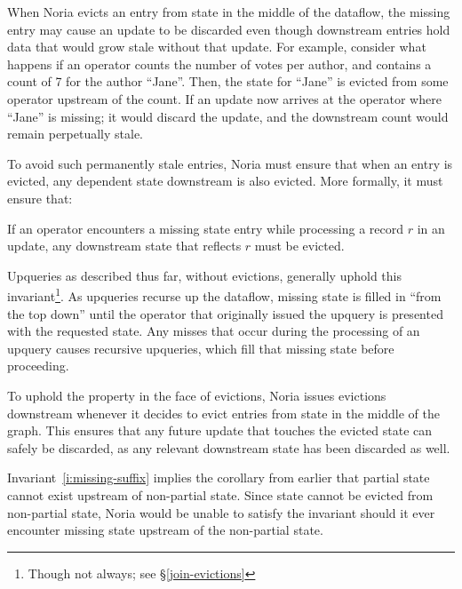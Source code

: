 When Noria evicts an entry from state in the middle of the dataflow, the missing
entry may cause an update to be discarded even though downstream entries hold
data that would grow stale without that update. For example, consider what
happens if an operator counts the number of votes per author, and contains a
count of 7 for the author ``Jane''. Then, the state for ``Jane'' is evicted from
some operator upstream of the count. If an update now arrives at the operator
where ``Jane'' is missing; it would discard the update, and the downstream count
would remain perpetually stale.

To avoid such permanently stale entries, Noria must ensure that when an entry is
evicted, any dependent state downstream is also evicted. More formally, it must
ensure that:

\begin{invariant}
  \label{i:missing-suffix}
  If an operator encounters a missing state entry while processing a record $r$
  in an update, any downstream state that reflects $r$ must be evicted.
\end{invariant}

Upqueries as described thus far, without evictions, generally uphold this
invariant\footnote{Though not always; see \S\ref{join-evictions}}. As upqueries
recurse up the dataflow, missing state is filled in ``from the top down'' until
the operator that originally issued the upquery is presented with the requested
state. Any misses that occur during the processing of an upquery causes
recursive upqueries, which fill that missing state before proceeding.

To uphold the property in the face of evictions, Noria issues evictions
downstream whenever it decides to evict entries from state in the middle of the
graph. This ensures that any future update that touches the evicted state can
safely be discarded, as any relevant downstream state has been discarded as
well.

Invariant~\ref{i:missing-suffix} implies the corollary from earlier that partial
state cannot exist upstream of non-partial state. Since state cannot be evicted
from non-partial state, Noria would be unable to satisfy the invariant should it
ever encounter missing state upstream of the non-partial state.
